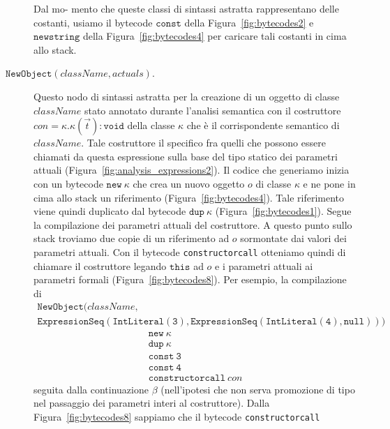 \begin{description}
  Dal mo-\linebreak
  mento che queste
  classi di sintassi astratta rappresentano delle costanti,
  usiamo il bytecode $\mathtt{const}$ della Figura~\ref{fig:bytecodes2}
  e $\mathtt{newstring}$ della Figura~\ref{fig:bytecodes4} per caricare tali
  costanti in cima allo stack.
\item[\underline{$\mathtt{NewObject(\mathit{className,\mathit{actuals}})}$}.]
  Questo nodo di sintassi astratta per la creazione di un oggetto di classe
  $\mathit{className}$ \e stato annotato durante l'analisi semantica con
  il costruttore $\mathit{con}=
  \kappa.\kappa(\vec{t})\mathtt{:void}$ della classe $\kappa$ che \`e
  il corrispondente semantico di $\mathit{className}$. Tale costruttore
  \e il \piu
  specifico fra quelli che possono essere chiamati da questa espressione
  sulla base del tipo
  statico dei parametri attuali (Figura~\ref{fig:analysis_expressions2}).
  Il codice che generiamo inizia con un bytecode $\mathtt{new}\ \kappa$ che
  crea un nuovo oggetto $o$ di classe $\kappa$ e ne pone in cima allo stack
  un riferimento (Figura~\ref{fig:bytecodes4}). Tale riferimento
  viene quindi duplicato dal bytecode $\mathtt{dup}\ \kappa$
  (Figura~\ref{fig:bytecodes1}).
  Segue la compilazione dei parametri attuali del costruttore.
  A questo punto sullo stack troviamo due copie di un riferimento
  ad $o$ sormontate dai valori dei parametri
  attuali. Con il bytecode \texttt{constructorcall} otteniamo quindi di
  chiamare il costruttore legando $\mathtt{this}$ ad $o$ e i parametri
  attuali ai parametri formali (Figura~\ref{fig:bytecodes8}).
  Per esempio, la compilazione di
  \begin{multline*}
    \mathtt{NewObject(\mathit{className},}\\
    \mathtt{ExpressionSeq(IntLiteral(3),ExpressionSeq(IntLiteral(4),null)))}
  \end{multline*}
  \e
  \[\begin{array}{l}
    \mathtt{new}\ \kappa\\
    \mathtt{dup}\ \kappa\\
    \mathtt{const\ 3}\\
    \mathtt{const\ 4}\\
    \mathtt{constructorcall\ \mathit{con}}
  \end{array}\]
  seguita dalla continuazione $\beta$ (nell'ipotesi che non serva promozione
  di tipo nel passaggio dei parametri interi al costruttore).
  Dalla Figura~\ref{fig:bytecodes8} sappiamo che
  il bytecode \texttt{constructorcall}

\end{description}
